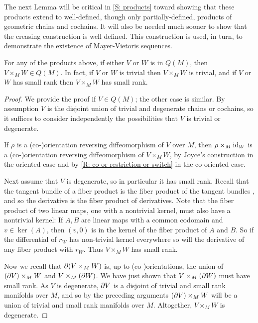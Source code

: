 The next Lemma will be critical in \cref{S: products} toward showing that these products extend to well-defined, though only partially-defined, products of geometric chains and cochains. It will also be needed much sooner to show that the creasing construction is well defined. This construction is used, in turn, to demonstrate the existence of Mayer-Vietoris sequences.

\begin{lemma}\label{L: pullback with Q}
For any of the products above, if either $V$ or $W$ is in $Q(M)$, then $V\times_MW\in Q(M)$. In fact, if $V$ or $W$ is trivial then $V\times_MW$ is trivial, and if $V$ or $W$ has small rank then $V\times_MW$ has small rank.
\end{lemma}
\begin{proof}
We provide the proof if $V\in Q(M)$; the other case is similar. By assumption $V$ is the disjoint union of trivial and degenerate chains or cochains, so it suffices to consider independently the possibilities that $V$ is trivial or degenerate.

If $\rho$ is a (co-)orientation reversing diffeomorphism of $V$ over $M$, then  $\rho\times_M  \mathrm{id}_W$ is a (co-)orientation reversing diffeomorphism of  $V\times_M W$, by Joyce's construction in the oriented case and by \cref{R: co-or restriction or switch} in the co-oriented case.

Next assume that $V$ is degenerate, so in particular it has small rank. Recall that the tangent bundle of a fiber product is the fiber product of the tangent bundles \cite[Theorem 5.47]{Wed16}, and so the derivative is the fiber product of derivatives.
Note that the fiber product of two linear maps, one with a nontrivial kernel, must also have a nontrivial kernel: If $A,B$ are linear maps with a common codomain and $v\in \ker(A)$, then $(v,0)$ is in the kernel of the fiber product  of $A$ and $B$.
So if  the differential of $r_W$ has non-trivial kernel everywhere so will the derivative of any fiber product with $r_W$. Thus $V\times_M W$ has small rank.

Now we recall that $\partial(V\times_M W)$ is, up to (co-)orientations, the union of $(\partial V)\times_M W$ and $V\times_M(\partial W)$. We have just shown that  $V\times_M(\partial W)$ must have small rank. As $V$ is degenerate, $\partial V$ is a disjoint of trivial and small rank manifolds over $M$, and so by the preceding arguments $(\partial V)\times_M W$ will be a union of trivial and small rank manifolds over $M$. Altogether, $V\times_M W$ is degenerate.
\end{proof}



